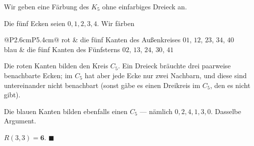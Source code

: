 \begin{merksatz}
Wir geben eine Färbung des $K_5$ ohne einfarbiges Dreieck an.

Die fünf Ecken seien $0,1,2,3,4$. Wir färben
\begin{center}
\renewcommand{\arraystretch}{1.5}
\begin{tabular}{@{}P{2.6cm}P{5.4cm}@{}}
\toprule
\textcolor{akzent}{rot} & die fünf Kanten des Außenkreises $01$, $12$, $23$, $34$, $40$\\
\textcolor{mittel}{blau} & die fünf Kanten des Fünfsterns $02$, $13$, $24$, $30$, $41$\\
\bottomrule
\end{tabular}
\end{center}

\begin{center}
\end{center}

 Die roten Kanten bilden den Kreis $C_5$. Ein Dreieck bräuchte drei paarweise benachbarte Ecken; im $C_5$ hat aber jede Ecke nur zwei Nachbarn, und diese sind untereinander nicht benachbart (sonst gäbe es einen Dreikreis im $C_5$, den es nicht gibt).

 Die blauen Kanten bilden ebenfalls einen $C_5$ --- nämlich $0,2,4,1,3,0$. Dasselbe Argument.

$R(3,3) = \mathbf{6}$. $\blacksquare$
\end{merksatz}


